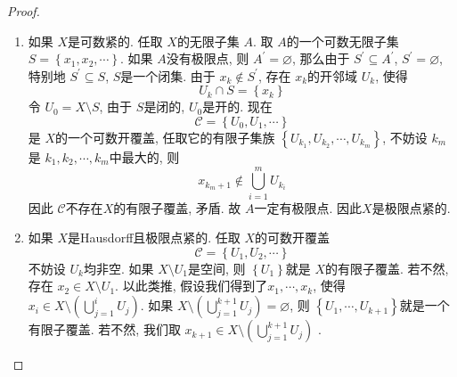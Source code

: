 \documentclass[../main.tex]{subfiles}
\begin{document}
\begin{proof}
    \begin{enumerate}
        \item 如果 \(  X  \)是可数紧的. 任取 \(  X  \)的无限子集 \(  A  \). 取 \(  A  \)的一个可数无限子集 \(  S= \left\{ x_1,x_2,\cdots  \right\}  \). 如果 \(  A  \)没有极限点, 则 \(  A^{\prime} = \varnothing  \), 那么由于 \(  S^{\prime} \subseteq A^{\prime}   \), \(  S^{\prime} = \varnothing  \), 特别地 \(  S^{\prime} \subseteq S  \), \(  S  \)是一个闭集.   由于 \(  x_{k}\not \in S^{\prime}   \), 存在 \(  x_{k}  \)的开邻域 \(  U_{k}  \), 使得 \[
        U_{k}\cap S= \left\{ x_{k} \right\}
        \]   令 \(  U_0= X\setminus S  \), 由于 \(  S  \)是闭的, \(  U_0  \)是开的. 现在 \[
        \mathcal{C}= \left\{ U_0,U_1,\cdots  \right\}
        \]   是 \(  X  \)的一个可数开覆盖, 任取它的有限子集族 \(  \left\{ U_{k_1},U_{k_2},\cdots ,U_{k_{m}} \right\}  \), 不妨设 \(  k_{m}  \)是 \(  k_1,k_2,\cdots ,k_{m}  \)中最大的, 则 \[
        x_{k_{m}+ 1}\not \in \bigcup _{i= 1}^{m}U_{k_{i}}
        \]    因此 \(  \mathcal{C}  \)不存在\(  X  \)的有限子覆盖, 矛盾. 故 \(  A  \)一定有极限点. 因此\(  X  \)是极限点紧的.
        \item 如果 \(  X  \)是Hausdorff且极限点紧的. 任取 \(  X  \)的可数开覆盖 \[
        \mathcal{C}= \left\{ U_1,U_2,\cdots  \right\}
        \]   不妨设 \(  U_{k}  \)均非空. 如果 \(  X\setminus U_1  \)是空间, 则 \(  \left\{ U_1 \right\}  \)就是 \(  X  \)的有限子覆盖. 若不然, 存在 \(  x_2 \in X\setminus U_1  \). 以此类推, 假设我们得到了\(  x_1,\cdots ,x_{k}  \), 使得 \(  x_{i}\in X\setminus \left( \bigcup _{j= 1}^{i}U_{j} \right)   \).       如果 \(  X\setminus \left( \bigcup _{j= 1}^{k+ 1}U_{j} \right)   = \varnothing\), 则 \(  \left\{ U_1,\cdots ,U_{k+ 1} \right\}  \)就是一个有限子覆盖. 若不然, 我们取 \(  x_{k+ 1}\in X\setminus \left( \bigcup _{j= 1}^{k+ 1}U_{j} \right)   \)   . 


\end{enumerate}
\end{proof}
\end{document}
